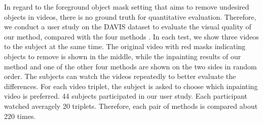 In regard to the foreground object mask setting that aims to remove undesired objects in videos, there is no ground truth for quantitative evaluation. 
Therefore, we conduct a user study on the DAVIS dataset to evaluate the visual quality of our method, compared with the four methods \cite{nazeri2019edgeconnect,wang2019video,Kim_2019_CVPR1,Xu_2019_CVPR}.
%
In each test, we show three videos to the subject at the same time. The original video with red masks indicating objects to remove is shown in the middle, while the inpainting results of our method and one of the other four methods are shown on the two sides in random order.
%  
The subjects can watch the videos repeatedly to better evaluate the differences.
For each video triplet, the subject is asked to choose which inpainting video is preferred.
44 subjects participated in our user study. 
Each participant watched averagely 20 triplets. 
Therefore, each pair of methods is compared about 220 times.

%


